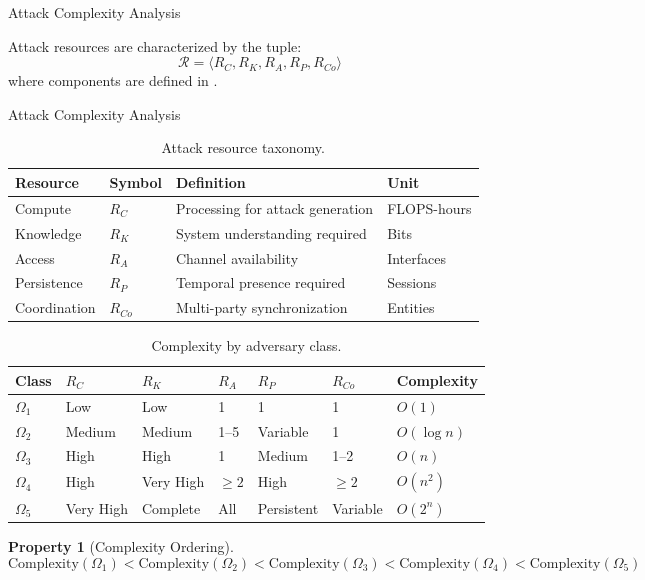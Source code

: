 \documentclass[
  ignorenonframetext,
]{beamer}
\providecommand{\cref}[1]{\texttt{\detokenize{#1}}}
\newtheorem{property}{Property}
\begin{document}
\begin{frame}[allowframebreaks]{Attack Complexity Analysis}
\begin{definition}
\label{def:resources}
Attack resources are characterized by the tuple:
\begin{equation}
\label{eq:resource-tuple}
\mathcal{R} = \langle R_C, R_K, R_A, R_P, R_{Co} \rangle
\end{equation}
where components are defined in \cref{tab:resource-types}.
\end{definition}

\end{frame}

\begin{frame}[allowframebreaks]{Attack Complexity Analysis}
\begin{table}[htbp]
\centering
\caption{Attack resource taxonomy.}
\label{tab:resource-types}
\begin{tabular}{@{}llp{4.5cm}l@{}}
\toprule
Resource & Symbol & Definition & Unit \\
\midrule
Compute & $R_C$ & Processing for attack generation & FLOPS-hours \\
Knowledge & $R_K$ & System understanding required & Bits \\
Access & $R_A$ & Channel availability & Interfaces \\
Persistence & $R_P$ & Temporal presence required & Sessions \\
Coordination & $R_{Co}$ & Multi-party synchronization & Entities \\
\bottomrule
\end{tabular}
\end{table}

\begin{table}[htbp]
\centering
\caption{Complexity by adversary class.}
\label{tab:complexity-by-class}
\begin{tabular}{@{}lllllll@{}}
\toprule
Class & $R_C$ & $R_K$ & $R_A$ & $R_P$ & $R_{Co}$ & Complexity \\
\midrule
$\Omega_1$ & Low & Low & 1 & 1 & 1 & $O(1)$ \\
$\Omega_2$ & Medium & Medium & 1--5 & Variable & 1 & $O(\log n)$ \\
$\Omega_3$ & High & High & 1 & Medium & 1--2 & $O(n)$ \\
$\Omega_4$ & High & Very High & $\geq 2$ & High & $\geq 2$ & $O(n^2)$ \\
$\Omega_5$ & Very High & Complete & All & Persistent & Variable & $O(2^n)$ \\
\bottomrule
\end{tabular}
\end{table}

\begin{property}[Complexity Ordering]
\label{prop:complexity-order}
\begin{equation}
\label{eq:complexity-order}
\text{Complexity}(\Omega_1) < \text{Complexity}(\Omega_2) < \text{Complexity}(\Omega_3) < \text{Complexity}(\Omega_4) < \text{Complexity}(\Omega_5)
\end{equation}
\end{property}
\end{frame}
\end{document}

